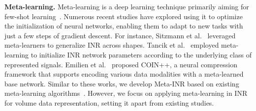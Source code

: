 {\bf Meta-learning.}
Meta-learning is a deep learning technique primarily aiming for few-shot learning~\cite{Song-ACM23}.
Numerous recent studies have explored using it to optimize the initialization of neural networks, enabling them to adapt to new tasks with just a few steps of gradient descent.
For instance, 
Sitzmann et al.\ \cite{Sitzmann-MetaSDF-NeurIPS20} leveraged meta-learners to generalize INR across shapes.
Tancik et al.\ \cite{Tancik-CVPR21} employed meta-learning to initialize INR network parameters according to the underlying class of represented signals.
Emilien et al.\ \cite{Emilien-TMLR} proposed COIN++, a neural compression framework that supports encoding various data modalities with a meta-learned base network.
Similar to these works, we develop Meta-INR based on existing meta-learning algorithms~\cite{Finn-ICML17, Nichol-arXiv18}.
However, we focus on applying meta-learning in INR for volume data representation, setting it apart from existing studies.
